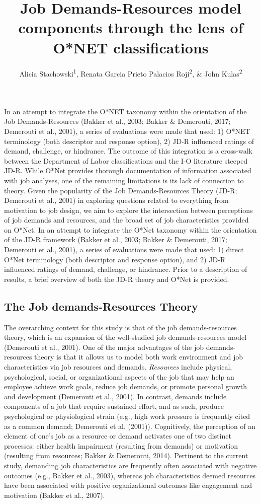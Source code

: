 \documentclass[
  english,
  man]{apa6}
\title{Job Demands-Resources model components through the lens of O*NET classifications}
\author{Alicia Stachowski\textsuperscript{1}, Renata Garcia Prieto Palacios Roji\textsuperscript{2}, \& John Kulas\textsuperscript{2}}
\date{}
\affiliation{\vspace{0.5cm}\textsuperscript{1} University of Wisconsin - Stout\\\textsuperscript{2} Montclair State University}
\begin{document}
\maketitle

In an attempt to integrate the O*NET taxonomy within the orientation of the Job Demands-Resources (Bakker et al., 2003; Bakker \& Demerouti, 2017; Demerouti et al., 2001), a series of evaluations were made that used: 1) O*NET terminology (both descriptor and response option), 2) JD-R influenced ratings of demand, challenge, or hindrance. The outcome of this integration is a cross-walk between the Department of Labor classifications and the I-O literature steeped JD-R. While O*Net provides thorough documentation of information associated with job analyses, one of the remaining limitations is its lack of connection to theory. Given the popularity of the Job Demands-Resources Theory (JD-R; Demerouti et al., 2001) in exploring questions related to everything from motivation to job design, we aim to explore the intersection between perceptions of job demands and resources, and the broad set of job characteristics provided on O*Net. In an attempt to integrate the O*Net taxonomy within the orientation of the JD-R framework (Bakker et al., 2003; Bakker \& Demerouti, 2017; Demerouti et al., 2001), a series of evaluations were made that used: 1) direct O*Net terminology (both descriptor and response option), and 2) JD-R influenced ratings of demand, challenge, or hindrance. Prior to a description of results, a brief overview of both the JD-R theory and O*Net is provided.

\hypertarget{the-job-demands-resources-theory}{%
\subsection{The Job demands-Resources Theory}\label{the-job-demands-resources-theory}}

The overarching context for this study is that of the job demands-resources theory, which is an expansion of the well-studied job demands-resources model (Demerouti et al., 2001). One of the major advantages of the job demands-resources theory is that it allows us to model both work environment and job characteristics via job resources and demands. \emph{Resources} include physical, psychological, social, or organizational aspects of the job that may help an employee achieve work goals, reduce job demands, or promote personal growth and development (Demerouti et al., 2001). In contrast, demands include components of a job that require sustained effort, and as such, produce psychological or physiological strain (e.g., high work pressure is frequently cited as a common demand; Demerouti et al. (2001)).
Cognitively, the perception of an element of one's job as a resource or demand activates one of two distinct processes: either health impairment (resulting from demands) or motivation (resulting from resources; Bakker \& Demerouti, 2014). Pertinent to the current study, demanding job characteristics are frequently often associated with negative outcomes (e.g., Bakker et al., 2003), whereas job characteristics deemed resources have been associated with positive organizational outcomes like engagement and motivation (Bakker et al., 2007).
\end{document}
